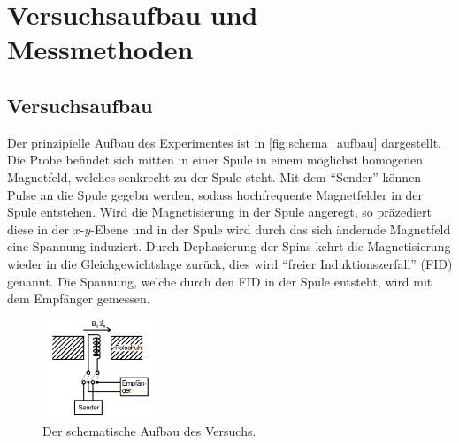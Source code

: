 \section{Versuchsaufbau und Messmethoden} 

    \subsection{Versuchsaufbau}
    \label{sec:Aufbau}

        \noindent Der prinzipielle Aufbau des Experimentes ist in \autoref{fig:schema_aufbau} dargestellt. Die Probe befindet sich mitten in einer Spule in einem möglichst homogenen Magnetfeld, welches senkrecht zu der Spule steht.
        Mit dem \enquote{Sender} können Pulse an die Spule gegebn werden, sodass hochfrequente Magnetfelder in der Spule entstehen. Wird die Magnetisierung in der Spule angeregt, so präzediert diese in der 
        $x$-$y$-Ebene und in der Spule wird durch das sich ändernde Magnetfeld eine Spannung induziert. Durch Dephasierung der Spins kehrt die Magnetisierung wieder in die Gleichgewichtslage zurück, dies wird 
        \enquote{freier Induktionszerfall} (FID) genannt. Die Spannung, welche durch den FID in der Spule entsteht, wird mit dem Empfänger gemessen. 

        \begin{figure}[H]
            \centering
            \includegraphics[width=0.3\textwidth]{latex/images/schema_aufbau.png}
            \caption{Der schematische Aufbau des Versuchs. \cite{finke}}
            \label{fig:schema_aufbau}
        \end{figure}

